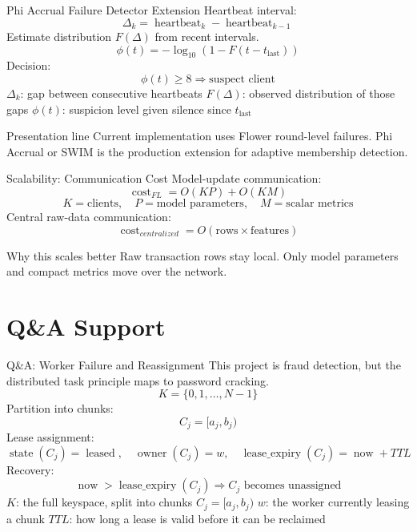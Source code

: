 \documentclass[aspectratio=169,10pt]{beamer}
\begin{document}
\begin{frame}{Phi Accrual Failure Detector Extension}
  Heartbeat interval:
  \[
    \Delta_k = \operatorname{heartbeat}_k - \operatorname{heartbeat}_{k-1}
  \]
  Estimate distribution \(F(\Delta)\) from recent intervals.
  \[
    \phi(t) =
    -\log_{10}\left(1 - F(t - t_{\text{last}})\right)
  \]
  Decision:
  \[
    \phi(t)\geq 8 \Rightarrow \text{suspect client}
  \]
  \footnotesize \(\Delta_k\): gap between consecutive heartbeats \quad \(F(\Delta)\): observed distribution of those gaps \quad \(\phi(t)\): suspicion level given silence since \(t_{\text{last}}\)
  \normalsize
  \begin{block}{Presentation line}
    Current implementation uses Flower round-level failures. Phi Accrual or SWIM is the production extension for adaptive membership detection.
  \end{block}
\end{frame}

\begin{frame}{Scalability: Communication Cost}
  Model-update communication:
  \[
    \operatorname{cost}_{FL} = O(KP) + O(KM)
  \]
  \[
    K=\text{clients},\quad P=\text{model parameters},\quad M=\text{scalar metrics}
  \]
  Central raw-data communication:
  \[
    \operatorname{cost}_{centralized}
    =
    O(\text{rows}\times\text{features})
  \]
  \begin{block}{Why this scales better}
    Raw transaction rows stay local. Only model parameters and compact metrics move over the network.
  \end{block}
\end{frame}

\section{Q\&A Support}

\begin{frame}{Q\&A: Worker Failure and Reassignment}
  This project is fraud detection, but the distributed task principle maps to password cracking.
  \[
    K = \{0,1,\ldots,N-1\}
  \]
  Partition into chunks:
  \[
    C_j = [a_j,b_j)
  \]
  Lease assignment:
  \[
    \operatorname{state}(C_j)=\operatorname{leased},
    \quad
    \operatorname{owner}(C_j)=w,
    \quad
    \operatorname{lease\_expiry}(C_j)=\operatorname{now}+TTL
  \]
  Recovery:
  \[
    \operatorname{now}>\operatorname{lease\_expiry}(C_j)
    \Rightarrow C_j \text{ becomes unassigned}
  \]
  \footnotesize \(K\): the full keyspace, split into chunks \(C_j=[a_j,b_j)\) \quad \(w\): the worker currently leasing a chunk \quad \(TTL\): how long a lease is valid before it can be reclaimed
\end{frame}
\end{document}
